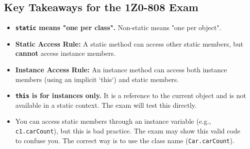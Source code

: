 \documentclass[12pt]{article}
\begin{document}
\begin{enumerate}[label=(\arabic*)]
\section{Key Takeaways for the 1Z0-808 Exam}
\begin{itemize}
    \item \textbf{\texttt{static} means "one per class".} Non-static means "one per object".
    \item \textbf{Static Access Rule:} A static method can access other static members, but \textbf{cannot} access instance members.
    \item \textbf{Instance Access Rule:} An instance method can access both instance members (using an implicit `this`) and static members.
    \item \textbf{\texttt{this} is for instances only.} It is a reference to the current object and is not available in a static context. The exam will test this directly.
    \item You can access static members through an instance variable (e.g., \texttt{c1.carCount}), but this is bad practice. The exam may show this valid code to confuse you. The correct way is to use the class name (\texttt{Car.carCount}).
\end{itemize}
\end{enumerate}
\end{document}
